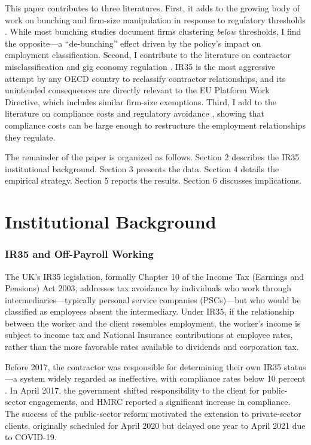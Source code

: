 \documentclass[12pt]{article}
\begin{document}
This paper contributes to three literatures. First, it adds to the growing body of work on bunching and firm-size manipulation in response to regulatory thresholds \citep{kleven2016bunching, garicano2016firm, hsieh2014life, gourio2017firms}. While most bunching studies document firms clustering \textit{below} thresholds, I find the opposite---a ``de-bunching'' effect driven by the policy's impact on employment classification. Second, I contribute to the literature on contractor misclassification and gig economy regulation \citep{adams2020offpayroll, naomi2022ir35, katz2019rise, abraham2018measuring}. IR35 is the most aggressive attempt by any OECD country to reclassify contractor relationships, and its unintended consequences are directly relevant to the EU Platform Work Directive, which includes similar firm-size exemptions. Third, I add to the literature on compliance costs and regulatory avoidance \citep{djankov2002regulation, slemrod2006optimal, benzarti2020tax}, showing that compliance costs can be large enough to restructure the employment relationships they regulate.

The remainder of the paper is organized as follows. Section 2 describes the IR35 institutional background. Section 3 presents the data. Section 4 details the empirical strategy. Section 5 reports the results. Section 6 discusses implications.


\section{Institutional Background}

\subsubsection*{IR35 and Off-Payroll Working} The UK's IR35 legislation, formally Chapter 10 of the Income Tax (Earnings and Pensions) Act 2003, addresses tax avoidance by individuals who work through intermediaries---typically personal service companies (PSCs)---but who would be classified as employees absent the intermediary. Under IR35, if the relationship between the worker and the client resembles employment, the worker's income is subject to income tax and National Insurance contributions at employee rates, rather than the more favorable rates available to dividends and corporation tax.

Before 2017, the contractor was responsible for determining their own IR35 status---a system widely regarded as ineffective, with compliance rates below 10 percent \citep{adams2020offpayroll}. In April 2017, the government shifted responsibility to the client for public-sector engagements, and HMRC reported a significant increase in compliance. The success of the public-sector reform motivated the extension to private-sector clients, originally scheduled for April 2020 but delayed one year to April 2021 due to COVID-19.
\end{document}
